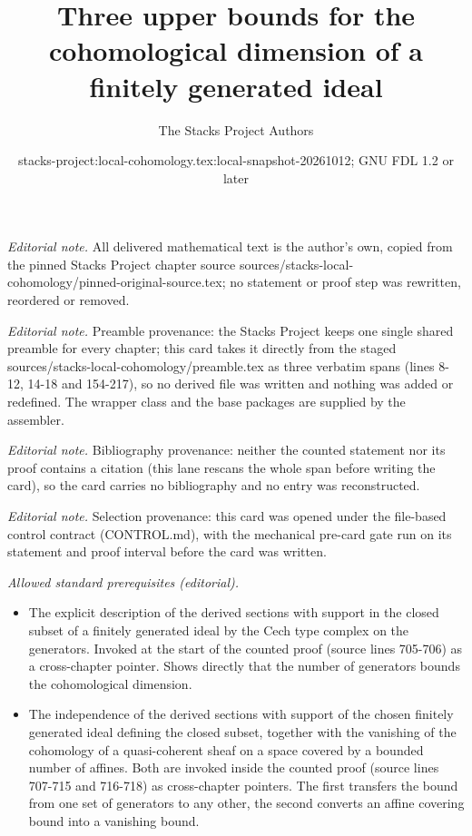 \documentclass[10pt,a4paper]{amsart}
\title{Three upper bounds for the cohomological dimension of a finitely generated ideal}
\author{The Stacks Project Authors}
\date{stacks-project:local-cohomology.tex:local-snapshot-20261012; GNU FDL 1.2 or later}
\theoremstyle{plain}
\theoremstyle{definition}
\theoremstyle{remark}
\numberwithin{equation}{subsection}
\begin{document}
\maketitle
\noindent\textit{Editorial note.} All delivered mathematical text is the author's own, copied from the pinned Stacks Project chapter source sources/stacks-local-cohomology/pinned-original-source.tex; no statement or proof step was rewritten, reordered or removed.\par\medskip
\noindent\textit{Editorial note.} Preamble provenance: the Stacks Project keeps one single shared preamble for every chapter; this card takes it directly from the staged sources/stacks-local-cohomology/preamble.tex as three verbatim spans (lines 8-12, 14-18 and 154-217), so no derived file was written and nothing was added or redefined. The wrapper class and the base packages are supplied by the assembler.\par\medskip
\noindent\textit{Editorial note.} Bibliography provenance: neither the counted statement nor its proof contains a citation (this lane rescans the whole span before writing the card), so the card carries no bibliography and no entry was reconstructed.\par\medskip
\noindent\textit{Editorial note.} Selection provenance: this card was opened under the file-based control contract (CONTROL.md), with the mechanical pre-card gate run on its statement and proof interval before the card was written.\par\medskip
\noindent\textit{Allowed standard prerequisites (editorial).}\begin{itemize}
\item The explicit description of the derived sections with support in the closed subset of a finitely generated ideal by the Cech type complex on the generators. Invoked at the start of the counted proof (source lines 705-706) as a cross-chapter pointer. Shows directly that the number of generators bounds the cohomological dimension.
\item The independence of the derived sections with support of the chosen finitely generated ideal defining the closed subset, together with the vanishing of the cohomology of a quasi-coherent sheaf on a space covered by a bounded number of affines. Both are invoked inside the counted proof (source lines 707-715 and 716-718) as cross-chapter pointers. The first transfers the bound from one set of generators to any other, the second converts an affine covering bound into a vanishing bound.
\end{itemize}\medskip
\end{document}
